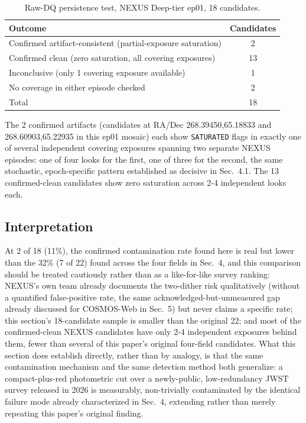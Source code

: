 \documentclass[11pt]{article}
\begin{document}
\begin{table}[H]
\centering
\caption{Raw-DQ persistence test, NEXUS Deep-tier ep01, 18 candidates.}
\label{tab:nexus_results}
\begin{tabular}{lc}
\toprule
Outcome & Candidates \\
\midrule
Confirmed artifact-consistent (partial-exposure saturation) & 2 \\
Confirmed clean (zero saturation, all covering exposures) & 13 \\
Inconclusive (only 1 covering exposure available) & 1 \\
No coverage in either episode checked & 2 \\
\midrule
Total & 18 \\
\bottomrule
\end{tabular}
\end{table}

The 2 confirmed artifacts (candidates at RA/Dec 268.39450,65.18833 and
268.60903,65.22935 in this ep01 mosaic) each show \texttt{SATURATED} flags in
exactly one of several independent covering exposures spanning two separate
NEXUS episodes: one of four looks for the first, one of three for the second,
the same stochastic, epoch-specific pattern established as decisive in
Sec.~4.1. The 13 confirmed-clean candidates show zero saturation across
2-4 independent looks each.

\subsection{Interpretation}

At 2 of 18 (11\%), the confirmed contamination rate found here is real but lower
than the 32\% (7 of 22) found across the four fields in Sec.~4, and this
comparison should be treated cautiously rather than as a like-for-like survey
ranking: NEXUS's own team already documents the two-dither risk qualitatively
(without a quantified false-positive rate, the same acknowledged-but-unmeasured
gap already discussed for COSMOS-Web in Sec.~5) but never claims a specific rate;
this section's 18-candidate sample is smaller than the original 22; and most of
the confirmed-clean NEXUS candidates have only 2-4 independent exposures behind
them, fewer than several of this paper's original four-field candidates. What
this section does establish directly, rather than by analogy, is that the same
contamination mechanism and the same detection method both generalize: a
compact-plus-red photometric cut over a newly-public, low-redundancy JWST survey
released in 2026 is measurably, non-trivially contaminated by the identical
failure mode already characterized in Sec.~4, extending rather than merely
repeating this paper's original finding.
\end{document}
